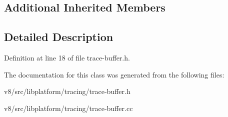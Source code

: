 \subsection*{Additional Inherited Members}


\subsection{Detailed Description}


Definition at line 18 of file trace-\/buffer.\+h.



The documentation for this class was generated from the following files\+:\begin{DoxyCompactItemize}
\item 
v8/src/libplatform/tracing/trace-\/buffer.\+h\item 
v8/src/libplatform/tracing/trace-\/buffer.\+cc\end{DoxyCompactItemize}
